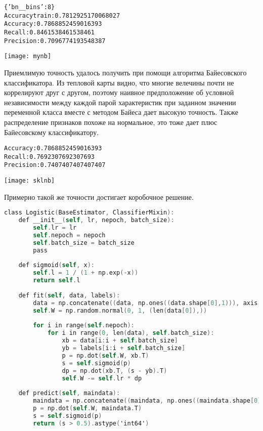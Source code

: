\begin{alltt}
\{'bn\_\_bins': 8\}
Accuracy train: 0.7812925170068027
Accuracy: 0.7868852459016393
Recall: 0.8461538461538461
Precision: 0.7096774193548387
\end{alltt}

\texttt{[image: mynb]} 

Приемлимую точность удалось получить при помощи алгоритма Байесовского классификатора. Из тепловой карты видно, что многие велечины почти не коррелируют друг с другом, поэтому наивное предположение об условной независимости между каждой парой характеристик при заданном значении переменной класса вместе с методом Байеса дает высокую точность. Также распределение признаков похоже на нормальное, это тоже дает плюс Байесовскому классификатору.

\begin{alltt}
Accuracy: 0.7868852459016393
Recall: 0.7692307692307693
Precision: 0.7407407407407407
\end{alltt}
\texttt{[image: sklnb]}

Примерно такой же точности достигает коробочное решение.



\begin{lstlisting}[language=C]
class Logistic(BaseEstimator, ClassifierMixin):
    def __init__(self, lr, nepoch, batch_size):
        self.lr = lr
        self.nepoch = nepoch
        self.batch_size = batch_size
        pass
    
    def sigmoid(self, x):
        self.l = 1 / (1 + np.exp(-x))
        return self.l
        
    def fit(self, data, labels):
        data = np.concatenate((data, np.ones((data.shape[0],1))), axis = 1)
        self.W = np.random.normal(0, 1, (len(data[0]),))
        
        for i in range(self.nepoch):
            for i in range(0, len(data), self.batch_size):
                xb = data[i:i + self.batch_size]
                yb = labels[i:i + self.batch_size]
                p = np.dot(self.W, xb.T)
                s = self.sigmoid(p)
                dp = np.dot(xb.T, (s - yb).T)
                self.W -= self.lr * dp
        
    def predict(self, maindata):
        maindata = np.concatenate((maindata, np.ones((maindata.shape[0],1))), axis = 1)
        p = np.dot(self.W, maindata.T)
        s = self.sigmoid(p)
        return (s > 0.5).astype('int64')
\end{lstlisting}

